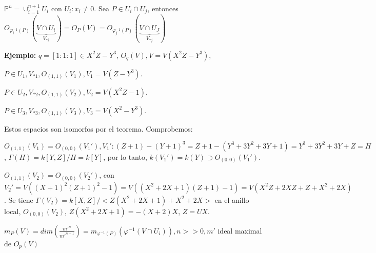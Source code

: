 \begin{Cor}
$\mathbb{P}^n=\cup_{i=1}^{n+1}U_i$ con $U_i: x_i\neq 0$. Sea $P\in U_i\cap U_j$, entonces $O_{\varphi_i^{-1}(P)}(\underbrace{V\cap U_i}_{V_{*i}})=O_P(V)=O_{\varphi^{-1}_j(P)}(\underbrace{V\cap U_J}_{V_{*j}})$
\end{Cor}

\textbf{Ejemplo:} $q=[1:1:1]\in X^2Z-Y^3$, $O_q(V), V=V(X^2Z-Y^3),$

$P\in U_1, V_{*1}, O_{(1,1)}(V_{1}), V_1=V(Z-Y^3)$.

$P\in U_2, V_{*2}, O_{(1,1)}(V_2), V_2=V(X^2Z-1)$.

$P\in U_3, V_{*3}, O_{(1,1)}(V_3), V_3=V(X^2-Y^3)$.

Estos espacios son isomorfos por el teorema. Comprobemos:

$O_{(1,1)}(V_1)=O_{(0,0)}(V_1'), V_1': (Z+1)-(Y+1)^3 = Z+1-(Y^3+3Y^2+3Y+1)=Y^3+3Y^2+3Y+Z=H$, $\Gamma(H)=k[Y,Z]/H=k[Y]$, por lo tanto, $k(V_1')=k(Y) \supset O_{(0,0)}(V_1')$.

$O_{(1,1)}(V_2)=O_{(0,0)}(V_2')$, con $V_2'=V((X+1)^2(Z+1)^2-1)=V((X^2+2X+1)(Z+1)-1)=V(X^2Z+2XZ+Z+X^2+2X)$. Se tiene $\Gamma(V_2)=k[X,Z]/<Z(X^2+2X+1)+X^2+2X>$ en el anillo local, $O_{(0,0)}(V_2)$, $Z(X^2+2X+1)=-(X+2)X$, $Z=UX$.

\vspace{5mm}

\begin{nota}
  $m_P(V)=dim(\frac{m'^n}{m'^{n+1}})=m_{\varphi^{-1}(P)}(\varphi^{-1}(V\cap U_i)), n>>0, m'$ ideal maximal de $O_p(V)$
\end{nota}
